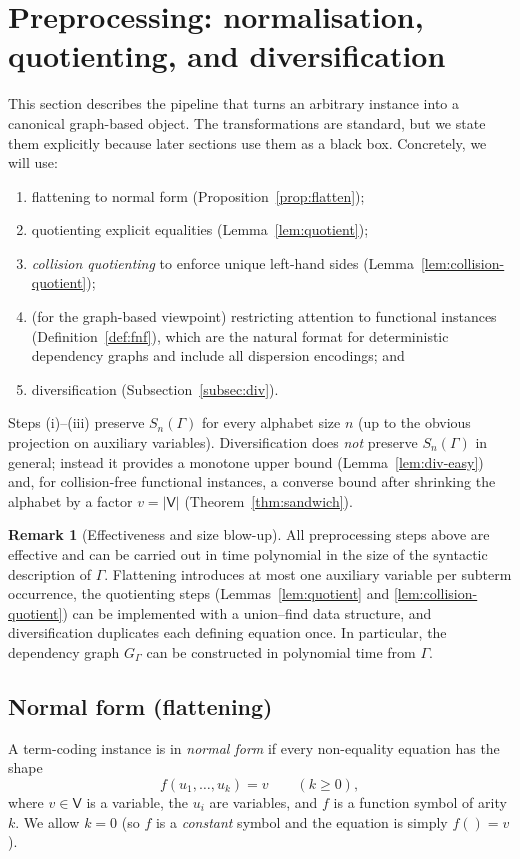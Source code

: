 \documentclass[11pt]{article}
\theoremstyle{definition}
\newtheorem{remark}{Remark}[section]
\theoremstyle{plain}
\newcommand{\Vars}{\mathsf{V}}
\newcommand{\Sn}{S_n}
\begin{document}
\section{Preprocessing: normalisation, quotienting, and diversification}
\label{sec:preprocess}

This section describes the pipeline that turns an arbitrary instance into a canonical graph-based
object.  The transformations are standard, but we state them explicitly because later sections use them
as a black box.  Concretely, we will use:
\begin{enumerate}[label=(\roman*)]
  \item flattening to normal form (Proposition~\ref{prop:flatten});
  \item quotienting explicit equalities (Lemma~\ref{lem:quotient});
  \item \emph{collision quotienting} to enforce unique left-hand sides (Lemma~\ref{lem:collision-quotient});
  \item (for the graph-based viewpoint) restricting attention to functional instances (Definition~\ref{def:fnf}),
        which are the natural format for deterministic dependency graphs and include all dispersion encodings; and
  \item diversification (Subsection~\ref{subsec:div}).
\end{enumerate}
Steps (i)--(iii) preserve $\Sn(\Gamma)$ for every alphabet size $n$ (up to the obvious projection on auxiliary
variables).  Diversification does \emph{not} preserve $S_n(\Gamma)$ in general; instead it provides a monotone upper bound
(Lemma~\ref{lem:div-easy}) and, for collision-free functional instances, a converse bound after shrinking the
alphabet by a factor $v=|\Vars|$ (Theorem~\ref{thm:sandwich}).

\begin{remark}[Effectiveness and size blow-up]
All preprocessing steps above are effective and can be carried out in time polynomial in the size of the
syntactic description of $\Gamma$.
Flattening introduces at most one auxiliary variable per subterm occurrence,
the quotienting steps (Lemmas~\ref{lem:quotient} and \ref{lem:collision-quotient}) can be implemented with a
union--find data structure, and diversification duplicates each defining equation once.
In particular, the dependency graph $G_\Gamma$ can be constructed in polynomial time from $\Gamma$.
\end{remark}

\subsection{Normal form (flattening)}
A term-coding instance is in \emph{normal form} if every non-equality equation has the shape
\begin{equation}
\label{eq:normalform}
f(u_1,\dots,u_k)=v\qquad (k\ge 0),
\end{equation}
where $v\in\Vars$ is a variable, the $u_i$ are variables, and $f$ is a function symbol of arity $k$.
We allow $k=0$ (so $f$ is a \emph{constant} symbol and the equation is simply $f()=v$).
\end{document}
